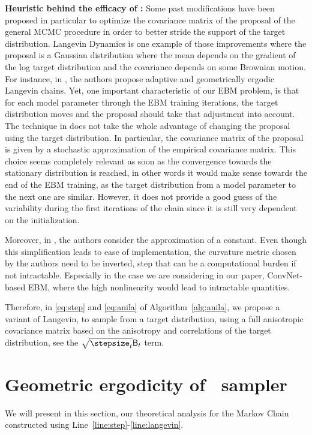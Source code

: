 \documentclass[10pt,twocolumn,letterpaper]{article}
\begin{document}
\textbf{Heuristic behind the efficacy of \algo:}
Some past modifications have been proposed in particular to optimize the covariance matrix of the proposal of the general MCMC procedure in order to better stride the support of the target distribution. 
Langevin Dynamics is one example of those improvements where the proposal is a Gaussian distribution where the mean depends on the gradient of the log target distribution and the covariance depends on some Brownian motion.
For instance, in \cite{atchade2006adaptive,marshall2012adaptive}, the authors propose adaptive and geometrically ergodic Langevin chains. 
Yet, one important characteristic of our EBM problem, is that for each model parameter through the EBM training iterations, the target distribution moves and the proposal should take that adjustment into account.
The technique in \cite{atchade2006adaptive,marshall2012adaptive} does not take the whole advantage of changing the proposal using the target distribution. 
In particular, the covariance matrix of the proposal is given by a stochastic approximation of the empirical covariance matrix. 
This choice seems completely relevant as soon as the convergence towards the stationary distribution is reached, in other words it would make sense towards the end of the EBM training, as the target distribution from a model parameter to the next one are similar. 
However, it does not provide a good guess of the variability during the first iterations of the chain since it is still very dependent on the initialization. 

Moreover, in  \cite{girolami2011riemann}, the authors consider the approximation of a constant. Even though this simplification leads to ease of implementation, the curvature metric chosen by the authors need to be inverted, step that can be a computational burden if not intractable. 
Especially in the case we are considering in our paper, \ie ConvNet-based EBM, where the high nonlinearity would lead to intractable quantities.

Therefore, in \eqref{eq:step} and \eqref{eq:anila} of Algorithm~\ref{alg:anila}, we propose a variant of Langevin, to sample from a target distribution, using a full anisotropic covariance matrix based on the anisotropy and correlations of the target distribution, see the $\sqrt{\stepsize_t} \mathsf{B}_t$ term. 


\section{Geometric ergodicity of \algo\ sampler}\label{sec:theory}
We will present in this section, our theoretical analysis for the Markov Chain constructed using Line~\ref{line:step}-\ref{line:langevin}. 
\end{document}
